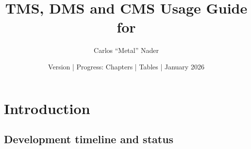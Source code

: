 \documentclass[11pt, a4paper, twoside]{report}
\title{TMS, DMS and CMS Usage Guide for \bmsver}
\author{Carlos ``Metal'' Nader}
\date{Version \fulldocversion{} | Progress: Chapters \chapterscompletedof{} | Tables \tablesfilledpct{} | January 2026}
\begin{document}
\maketitle


\setcounter{tocdepth}{3}       %
\setcounter{secnumdepth}{3}    %

\newpage
\tableofcontents
\newpage
{}

\chapter{Introduction}
\label{chap:C1}

\section{Development timeline and status}
\label{sec:C1-S1}
\end{document}
